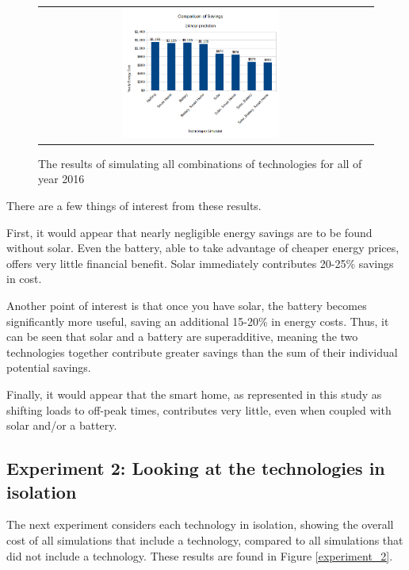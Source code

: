 \begin{figure}
 \begin{center}
  \begin{tabular}{cc}
   \includegraphics[width=0.50\textwidth]{./figures/experiment_1.png} \\
   \end{tabular}
   \end{center}
\caption{The results of simulating all combinations of technologies for all of year 2016}
  \vspace{+1mm}
\label{experiment_1}
\end{figure}

There are a few things of interest from these results.

First, it would appear that nearly negligible energy savings are to be found without solar. Even the battery, able to take advantage of cheaper energy prices, offers very little financial benefit. Solar immediately contributes 20-25\% savings in cost.

Another point of interest is that once you have solar, the battery becomes significantly more useful, saving an additional 15-20\% in energy costs. Thus, it can be seen that solar and a battery are superadditive, meaning the two technologies together contribute greater savings than the sum of their individual potential savings.

Finally, it would appear that the smart home, as represented in this study as shifting loads to off-peak times, contributes very little, even when coupled with solar and/or a battery.

\subsection*{Experiment 2: Looking at the technologies in isolation}

The next experiment considers each technology in isolation, showing the overall cost of all simulations that include a technology, compared to all simulations that did not include a technology. These results are found in Figure \ref{experiment_2}.


